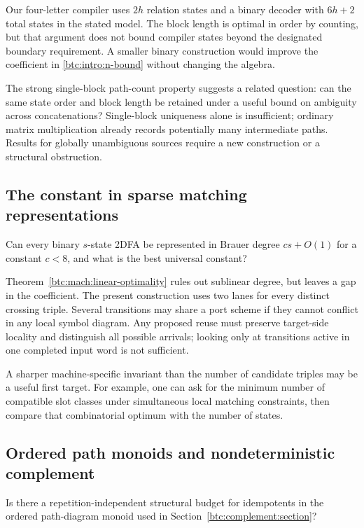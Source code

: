 Our four-letter compiler uses $2h$ relation states and a
binary decoder with $6h+2$ total states in the stated model.
The block length is optimal in order by counting, but that
argument does not bound compiler states beyond the designated
boundary requirement. A smaller binary construction would
improve the coefficient in \eqref{btc:intro:n-bound} without
changing the algebra.

The strong single-block path-count property suggests a
related question: can the same state order and block length
be retained under a useful bound on ambiguity across
concatenations? Single-block uniqueness alone is insufficient;
ordinary matrix multiplication already records potentially
many intermediate paths. Results for globally unambiguous
sources require a new construction or a structural obstruction.

\subsection{The constant in sparse matching representations}

\begin{question}
Can every binary $s$-state 2DFA be represented in Brauer
degree $cs+O(1)$ for a constant $c<8$, and what is the best
universal constant?
\end{question}

Theorem~\ref{btc:mach:linear-optimality} rules out sublinear
degree, but leaves a gap in the coefficient. The present
construction uses two lanes for every distinct crossing triple.
Several transitions may share a port scheme if they cannot
conflict in any local symbol diagram. Any proposed reuse must
preserve target-side locality and distinguish all possible
arrivals; looking only at transitions active in one completed
input word is not sufficient.

A sharper machine-specific invariant than the number of
candidate triples may be a useful first target. For example,
one can ask for the minimum number of compatible slot classes
under simultaneous local matching constraints, then compare
that combinatorial optimum with the number of states.

\subsection{Ordered path monoids and nondeterministic complement}

\begin{question}
Is there a repetition-independent structural budget for
idempotents in the ordered path-diagram monoid used in
Section~\ref{btc:complement:section}?
\end{question}


